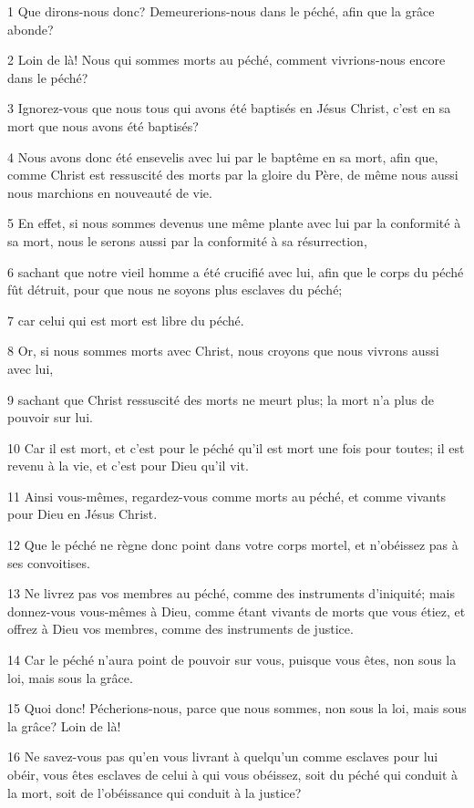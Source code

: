 \par 1 Que dirons-nous donc? Demeurerions-nous dans le péché, afin que la grâce abonde?
\par 2 Loin de là! Nous qui sommes morts au péché, comment vivrions-nous encore dans le péché?
\par 3 Ignorez-vous que nous tous qui avons été baptisés en Jésus Christ, c'est en sa mort que nous avons été baptisés?
\par 4 Nous avons donc été ensevelis avec lui par le baptême en sa mort, afin que, comme Christ est ressuscité des morts par la gloire du Père, de même nous aussi nous marchions en nouveauté de vie.
\par 5 En effet, si nous sommes devenus une même plante avec lui par la conformité à sa mort, nous le serons aussi par la conformité à sa résurrection,
\par 6 sachant que notre vieil homme a été crucifié avec lui, afin que le corps du péché fût détruit, pour que nous ne soyons plus esclaves du péché;
\par 7 car celui qui est mort est libre du péché.
\par 8 Or, si nous sommes morts avec Christ, nous croyons que nous vivrons aussi avec lui,
\par 9 sachant que Christ ressuscité des morts ne meurt plus; la mort n'a plus de pouvoir sur lui.
\par 10 Car il est mort, et c'est pour le péché qu'il est mort une fois pour toutes; il est revenu à la vie, et c'est pour Dieu qu'il vit.
\par 11 Ainsi vous-mêmes, regardez-vous comme morts au péché, et comme vivants pour Dieu en Jésus Christ.
\par 12 Que le péché ne règne donc point dans votre corps mortel, et n'obéissez pas à ses convoitises.
\par 13 Ne livrez pas vos membres au péché, comme des instruments d'iniquité; mais donnez-vous vous-mêmes à Dieu, comme étant vivants de morts que vous étiez, et offrez à Dieu vos membres, comme des instruments de justice.
\par 14 Car le péché n'aura point de pouvoir sur vous, puisque vous êtes, non sous la loi, mais sous la grâce.
\par 15 Quoi donc! Pécherions-nous, parce que nous sommes, non sous la loi, mais sous la grâce? Loin de là!
\par 16 Ne savez-vous pas qu'en vous livrant à quelqu'un comme esclaves pour lui obéir, vous êtes esclaves de celui à qui vous obéissez, soit du péché qui conduit à la mort, soit de l'obéissance qui conduit à la justice?
